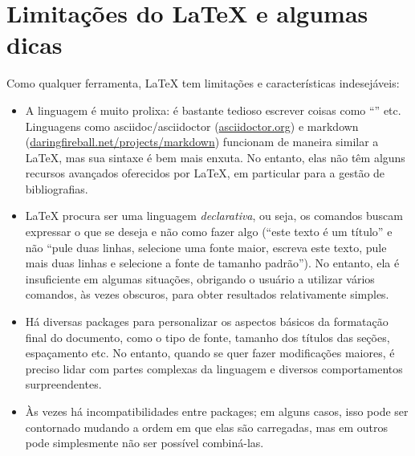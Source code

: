 \section{Limitações do \LaTeX{} e algumas dicas}
\label{sec:limitations}

Como qualquer ferramenta, \LaTeX{} tem limitações e características
indesejáveis:

\begin{itemize}
    \item A linguagem é muito prolixa: é bastante tedioso escrever
    coisas como ``'' etc. Linguagens
    como asciidoc/asciidoctor (\url{asciidoctor.org}) e markdown
    (\url{daringfireball.net/projects/markdown}) funcionam de
    maneira similar a \LaTeX{}, mas sua sintaxe é bem mais enxuta.
    No entanto, elas não têm alguns recursos avançados oferecidos
    por \LaTeX{}, em particular para a gestão de bibliografias.

    \item \LaTeX{} procura ser uma linguagem \emph{declarativa}, ou seja,
    os comandos buscam expressar o que se deseja e não como fazer algo
    (``este texto é um título'' e não ``pule duas linhas, selecione uma
    fonte maior, escreva este texto, pule mais duas linhas e selecione a
    fonte de tamanho padrão''). No entanto, ela é insuficiente em algumas
    situações, obrigando o usuário a utilizar vários comandos, às vezes
    obscuros, para obter resultados relativamente simples.

    \item Há diversas packages para personalizar os aspectos básicos
    da formatação final do documento, como o tipo de fonte, tamanho dos
    títulos das seções, espaçamento etc. No entanto, quando se quer
    fazer modificações maiores, é preciso lidar com partes complexas da
    linguagem e diversos comportamentos surpreendentes.

    \item Às vezes há incompatibilidades entre packages; em alguns casos,
    isso pode ser contornado mudando a ordem em que elas são carregadas,
    mas em outros pode simplesmente não ser possível combiná-las.


\end{itemize}
